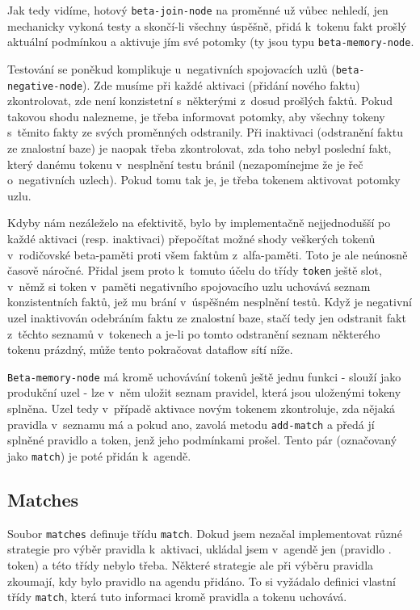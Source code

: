 Jak tedy vidíme, hotový \verb|beta-join-node| na proměnné už vůbec nehledí,
jen mechanicky vykoná testy a skončí-li všechny úspěšně, přidá k~tokenu
fakt prošlý aktuální podmínkou a aktivuje jím své potomky (ty jsou typu
\verb|beta-memory-node|.

Testování se poněkud komplikuje u~negativních spojovacích uzlů
(\verb|beta-negative-node|). Zde musíme při každé aktivaci (přidání nového
faktu) zkontrolovat, zde není konzistetní s~některými z~dosud prošlých faktů.
Pokud takovou shodu nalezneme, je třeba informovat potomky, aby všechny
tokeny s~těmito fakty ze svých proměnných odstranily. Při inaktivaci
(odstranění faktu ze znalostní baze) je naopak třeba zkontrolovat, zda toho
nebyl poslední fakt, který danému tokenu v~nesplnění testu bránil (nezapomínejme
že je řeč o~negativních uzlech). Pokud tomu tak je, je třeba tokenem aktivovat
potomky uzlu.

Kdyby nám nezáleželo na efektivitě, bylo by implementačně nejjednodušší po
každé aktivaci (resp. inaktivaci) přepočítat možné shody veškerých tokenů
v~rodičovské beta-paměti proti všem faktům z~alfa-paměti. Toto je ale
neúnosně časově náročné. Přidal jsem proto k~tomuto účelu do třídy \verb|token|
ještě slot, v~němž si token v~paměti negativního spojovacího uzlu uchovává
seznam konzistentních faktů, jež mu brání v~úspěšném nesplnění testů. Když
je negativní uzel inaktivován odebráním faktu ze znalostní baze, stačí tedy
jen odstranit fakt z~těchto seznamů v~tokenech a je-li po tomto odstranění
seznam některého tokenu prázdný, může tento pokračovat dataflow sítí níže.

\verb|Beta-memory-node| má kromě uchovávání tokenů ještě jednu funkci -
slouží jako produkční uzel - lze v~něm uložit seznam pravidel, která jsou
uloženými tokeny splněna. Uzel tedy v~případě aktivace novým tokenem
zkontroluje, zda nějaká pravidla v~seznamu má a pokud ano, zavolá metodu
\verb|add-match| a předá jí splněné pravidlo a token, jenž jeho podmínkami
prošel. Tento pár (označovaný jako \verb|match|) je poté přidán k~agendě.
\subsection{Matches}
Soubor \verb|matches| definuje třídu \verb|match|. Dokud jsem nezačal
implementovat různé strategie pro výběr pravidla k~aktivaci, ukládal jsem
v~agendě jen (pravidlo . token) a této třídy nebylo třeba. Některé strategie ale
při výběru pravidla zkoumají, kdy bylo pravidlo na agendu přidáno. To si
vyžádalo definici vlastní třídy \verb|match|, která tuto informaci kromě
pravidla a tokenu uchovává.
